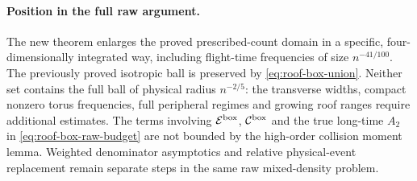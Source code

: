 \paragraph{Position in the full raw argument.}
The new theorem enlarges the proved prescribed-count domain in a
specific, four-dimensionally integrated way, including flight-time
frequencies of size $n^{-41/100}$. The previously proved isotropic
ball is preserved by \eqref{eq:roof-box-union}. Neither set contains
the full ball of physical radius $n^{-2/5}$: the transverse widths,
compact nonzero torus frequencies, full peripheral regimes and growing
roof ranges require additional estimates. The terms involving
$\mathcal E^{\rm box}$, $\mathcal C^{\rm box}$ and the true long-time
$A_2$ in \eqref{eq:roof-box-raw-budget} are not bounded by the high-order
collision moment lemma. Weighted denominator asymptotics and relative
physical-event replacement remain separate steps in the same raw
mixed-density problem.
